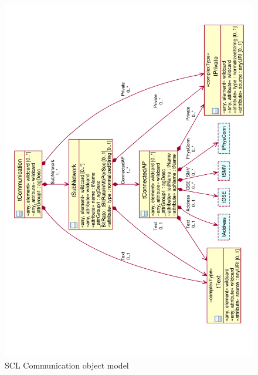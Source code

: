 \begin{landscape}
	\begin{figure}
	  \includegraphics[angle=-90, width=1.0\linewidth]{chapters/ch-scl/figures/SCL-uml-communication-Deept3}
	  \caption{SCL Communication object model}  
	  \label{fig:pdf-SCL-uml-communication-Deept3}
	\end{figure}
\end{landscape}


